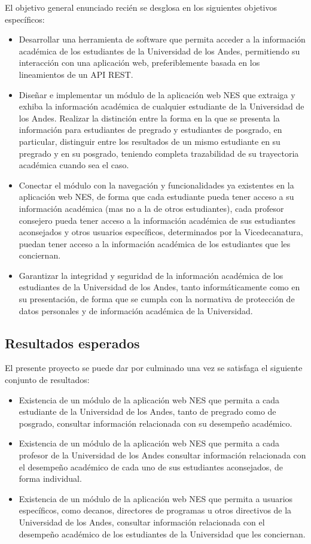 El objetivo general enunciado recién se desglosa en los siguientes objetivos específicos:
\begin{itemize}
	\item Desarrollar una herramienta de software que permita acceder a la información académica de los estudiantes de la Universidad de los Andes, permitiendo su interacción con una aplicación web, preferiblemente basada en los lineamientos de un \gls{API REST}.
	\item Diseñar e implementar un módulo de la aplicación web \gls{NES} que extraiga y exhiba la información académica de cualquier estudiante de la Universidad de los Andes. Realizar la distinción entre la forma en la que se presenta la información para estudiantes de pregrado y estudiantes de posgrado, en particular, distinguir entre los resultados de un mismo estudiante en su pregrado y en su posgrado, teniendo completa trazabilidad de su trayectoria académica cuando sea el caso.
	\item Conectar el módulo con la navegación y funcionalidades ya existentes en la aplicación web \gls{NES}, de forma que cada estudiante pueda tener acceso a su información académica (mas no a la de otros estudiantes), cada profesor consejero pueda tener acceso a la información académica de sus estudiantes aconsejados y otros usuarios específicos, determinados por la Vicedecanatura, puedan tener acceso a la información académica de los estudiantes que les conciernan.
	\item Garantizar la integridad y seguridad de la información académica de los estudiantes de la Universidad de los Andes, tanto informáticamente como en su presentación, de forma que se cumpla con la normativa de protección de datos personales y de información académica de la Universidad.
\end{itemize}

\subsection{Resultados esperados}

El presente proyecto se puede dar por culminado una vez se satisfaga el siguiente conjunto de resultados:
\begin{itemize}
	\item Existencia de un módulo de la aplicación web \gls{NES} que permita a cada estudiante de la Universidad de los Andes, tanto de pregrado como de posgrado, consultar información relacionada con su desempeño académico.
	\item Existencia de un módulo de la aplicación web \gls{NES} que permita a cada profesor de la Universidad de los Andes consultar información relacionada con el desempeño académico de cada uno de sus estudiantes aconsejados, de forma individual.
	\item Existencia de un módulo de la aplicación web \gls{NES} que permita a usuarios específicos, como decanos, directores de programas u otros directivos de la Universidad de los Andes, consultar información relacionada con el desempeño académico de los estudiantes de la Universidad que les conciernan.
\end{itemize}

